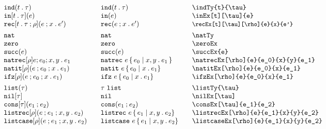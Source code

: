 \documentclass[11pt]{article}
\begin{document}
\begin{figure}
  
  \begin{small}
    \begin{displaymath}
      \begin{array}{l@{\qquad}l@{\qquad}l@{\qquad}l}
        \indTy{t}{\tau}                            & \indTy*{t}{\tau}                & \verb|\indTy{t}{\tau}|                            \\
        \inEx[t][\tau]{e}                          & \inEx*{e}                       & \verb|\inEx[t][\tau]{e}|                          \\
        \recEx[t][\tau][\rho]{e}{x}{e'}            & \recEx*{e}{x}{e'}               & \small{\verb|\recEx[t][\tau][\rho]{e}{x}{e'}|}    \\[1ex]
  
        \natTy                                     & \natTy*                         & \verb|\natTy|                                   \\
        \zeroEx                                    & \zeroEx*                        & \verb|\zeroEx|                                    \\
        \succEx{e}                                 & \succEx*{e}                     & \verb|\succEx{e}|                                 \\
        \natrecEx[\rho]{e}{e_0}{x}{y}{e_1}         & \natrecEx*[\rho]{e}{e_0}{x}{y}{e_1} & \verb|\natrecEx[\rho]{e}{e_0}{x}{y}{e_1}| \\
        \natitEx[\rho]{e}{e_0}{x}{e_1}             & \natitEx*{e}{e_0}{x}{e_1}       & \verb|\natitEx[\rho]{e}{e_0}{x}{e_1}|             \\
        \ifzEx[\rho]{e}{e_0}{x}{e_1}               & \ifzEx*{e}{e_0}{x}{e_1}         & \verb|\ifzEx[\rho]{e}{e_0}{x}{e_1}|               \\[1ex]
  
        \listTy{\tau}                              & \listTy*{\tau}                  & \verb|\listTy{\tau}|                              \\
        \nilEx[\tau]                               & \nilEx*                         & \verb|\nilEx[\tau]|                               \\
        \consEx[\tau]{e_1}{e_2}                    & \consEx*{e_1}{e_2}              & \verb|\consEx[\tau]{e_1}{e_2}|                    \\
        \listrecEx[\rho]{e}{e_1}{x}{y}{e_2}        & \listrecEx*{e}{e_1}{x}{y}{e_2}  & \verb|\listrecEx[\rho]{e}{e_1}{x}{y}{e_2}|  \\
        \listcaseEx[\rho]{e}{e_1}{x}{y}{e_2}       & \listcaseEx*{e}{e_1}{x}{y}{e_2} & \verb|\listcaseEx[\rho]{e}{e_1}{x}{y}{e_2}| \\[1ex]
  

\end{array}
\end{displaymath}
\end{small}
\end{figure}
\end{document}
